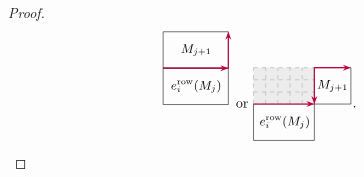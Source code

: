 \documentclass[12pt]{amsart}
\newcommand{\cell}{.28}
\newcommand{\phantomtile}[5]{%
\begin{scope}[shift={(#1,#2)}]
  \fill[gray!15] (0,0) rectangle ({#3*\cell},{#4*\cell});
  \draw[gray!70, dashed, step=\cell] (0,0) grid ({#3*\cell},{#4*\cell});
  #5
\end{scope}
}
\theoremstyle{definition}
\theoremstyle{remark}
\begin{document}
\begin{proof}
\[{{\begin{tikzpicture}[scale=1.1, baseline=-.5ex]
\draw (0,0) rectangle (1.50,.84);
\node at (.76,.42) {\small{$e_i^{\mathrm{row}}(M_{j})$}};

\draw (0,.84) rectangle (1.50,1.68);
\node at (0.76,1.26) {\small{$M_{j+1}$}};

\draw[purple, -{Stealth[length=2mm,width=1.5mm]}, thick] (0,.84) -- (1.50,.84);
\draw[purple, -{Stealth[length=2mm,width=1.5mm]}, thick] (1.50,.84) -- (1.50,1.68);
\end{tikzpicture}}}
\, \, \text{or} \, \,
\vcenter{\hbox{\begin{tikzpicture}[scale=1.1, baseline=-.5ex]

\draw (0,0) rectangle (1.40,.84);
\node at (.72,.42) {\small{$e_i^{\mathrm{row}}(M_{j})$}};

{\phantomtile{0}{.84}{5}{3}{
}}

\draw (1.40,.84) rectangle (1.40+.84,1.68);
\node at (1.82,1.26) {\small{$M_{j+1}$}};


\draw[purple, -{Stealth[length=2mm,width=1.5mm]}, thick] (0,.84) -- (1.40,.84);
\draw[purple, -{Stealth[length=2mm,width=1.5mm]}, thick] (1.4,1.68) -- (1.4,.84);
\draw[purple, -{Stealth[length=2mm,width=1.5mm]}, thick] (1.4,1.68) -- (1.40+.84,1.68);
\end{tikzpicture}}}.\]


\end{proof}
\end{document}
